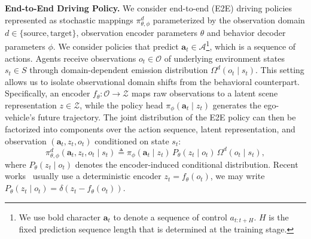 \documentclass{article}
\begin{document}
\noindent \textbf{End-to-End Driving Policy.} We consider end-to-end (E2E) driving policies represented as stochastic mappings $\pi^{d}_{\theta,\phi}$ parameterized by the observation domain $d\in\{\mathrm{source},\mathrm{target}\}$, observation encoder parameters $\theta$ and behavior decoder parameters $\phi$. We consider policies that predict $\mathbf{a}_t\in\mathcal{A}$\footnote{We use bold character $\mathbf{a}_t$ to denote a sequence of control $a_{t:t+H}$. $H$ is the fixed prediction sequence length that is determined at the training stage.}, which is a sequence of actions. Agents receive observations $o_t\in \mathcal{O}$ of underlying environment states $s_t\in S$ through domain-dependent emission distribution $\Omega^d(o_t\mid s_t)$. This setting allows us to isolate observational domain shifts from the behavioral counterpart. Specifically, an encoder $f_\theta: \mathcal{O} \to \mathcal{Z}$ maps raw observations to a latent scene representation $z \in \mathcal{Z}$, while the policy head $\pi_\phi(\mathbf{a}_t \mid z_t)$ generates the ego-vehicle's future trajectory. The joint distribution of the E2E policy can then be factorized into components over the action sequence, latent representation, and observation $(\mathbf{a}_t, z_t, o_t)$ conditioned on state $s_t$:
\begin{equation}
\label{eq:policy_state_latent_factor}
    \pi^{d}_{\theta,\phi}(\mathbf{a}_t,z_t,o_t \mid s_t) \triangleq \pi_{\phi}(\mathbf{a}_t\mid z_t)\,P_\theta(z_t\mid o_t)\,\Omega^d(o_t\mid s_t),
\end{equation}
where $P_\theta(z_t\mid o_t)$ denotes the encoder-induced conditional distribution. Recent works~\cite{diffusiondrive, diffusiondrivev2, RAP} usually use a deterministic encoder $z_t=f_\theta(o_t)$, we may write $P_\theta(z_t\mid o_t)=\delta(z_t-f_\theta(o_t))$.
\end{document}
